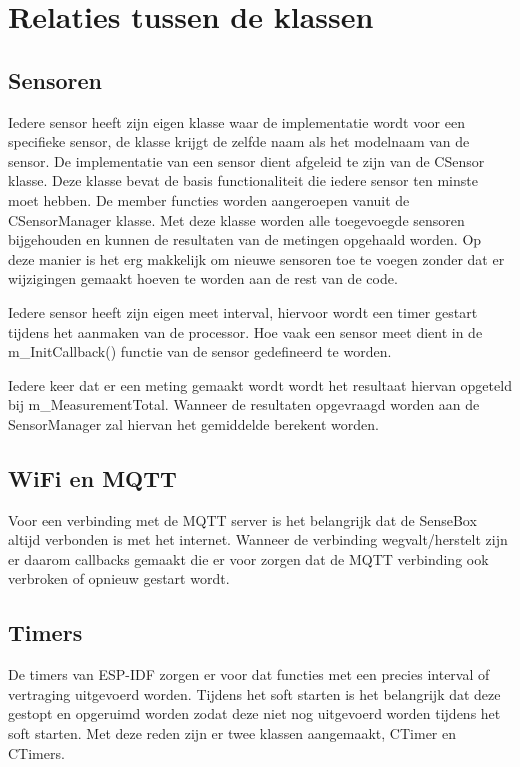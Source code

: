 \section{Relaties tussen de klassen}

\subsection{Sensoren}

Iedere sensor heeft zijn eigen klasse waar de implementatie wordt voor een specifieke sensor, de klasse krijgt de zelfde naam als het modelnaam van de sensor. De implementatie van een sensor dient afgeleid te zijn van de CSensor klasse. Deze klasse bevat de basis functionaliteit die iedere sensor ten minste moet hebben. De member functies worden aangeroepen vanuit de CSensorManager klasse. Met deze klasse worden alle toegevoegde sensoren bijgehouden en kunnen de resultaten van de metingen opgehaald worden. Op deze manier is het erg makkelijk om nieuwe sensoren toe te voegen zonder dat er wijzigingen gemaakt hoeven te worden aan de rest van de code.

\vspace{1em}
Iedere sensor heeft zijn eigen meet interval, hiervoor wordt een timer gestart tijdens het aanmaken van de processor. Hoe vaak een sensor meet dient in de m\_InitCallback() functie van de sensor gedefineerd te worden.

\vspace{1em}
Iedere keer dat er een meting gemaakt wordt wordt het resultaat hiervan opgeteld bij m\_MeasurementTotal. Wanneer de resultaten opgevraagd worden aan de SensorManager zal hiervan het gemiddelde berekent worden.

\subsection{WiFi en MQTT}

Voor een verbinding met de MQTT server is het belangrijk dat de SenseBox altijd verbonden is met het internet. Wanneer de verbinding wegvalt/herstelt zijn er daarom callbacks gemaakt die er voor zorgen dat de MQTT verbinding ook verbroken of opnieuw gestart wordt.

\subsection{Timers}

De timers van ESP-IDF zorgen er voor dat functies met een precies interval of vertraging uitgevoerd worden. Tijdens het soft starten is het belangrijk dat deze gestopt en opgeruimd worden zodat deze niet nog uitgevoerd worden tijdens het soft starten. Met deze reden zijn er twee klassen aangemaakt, CTimer en CTimers.

